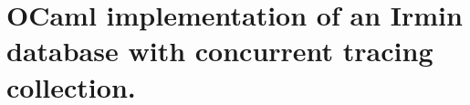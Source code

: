 \section{OCaml implementation of an Irmin database with concurrent tracing collection.}
\label{app:concurrent-modular-tracing}

\inputminted{ocaml}{appendices/sources/database.ml}